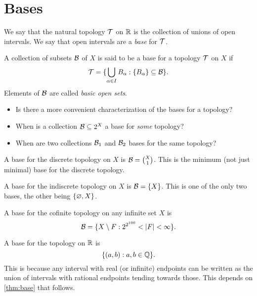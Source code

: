\section{Bases} \label{sec:bases}
We say that the natural topology $\mathcal{T}$ on $\mathbb{R}$ is the collection of unions
of open intervals.
We say that open intervals are a \emph{base} for $\mathcal{T}$.

\begin{definition*}[Base] \label{def:base}
    A collection of subsets $\mathcal{B}$ of $X$ is said to be a base for a
    topology $\mathcal{T}$ on $X$ if \[
        \mathcal{T} = \{\bigcup_{\alpha \in I} B_\alpha :
                \{B_\alpha\} \subseteq \mathcal{B}\}.
    \] Elements of $\mathcal{B}$ are called \emph{basic open sets}.
\end{definition*}

\begin{question} \leavevmode
    \begin{itemize}
        \item Is there a more convenient characterization of the bases for
            a topology?
        \item When is a collection $\mathcal{B} \subseteq 2^X$ a base for
            \emph{some} topology?
        \item When are two collections $\mathcal{B}_1$ and $\mathcal{B}_2$ bases for the
            same topology?
    \end{itemize}
\end{question}

\begin{examples}
    \item A base for the discrete topology on $X$ is $\mathcal{B} = \binom{X}{1}$.
        This is the minimum (not just minimal) base for the
        discrete topology.
    \item A base for the indiscrete topology on $X$ is $\mathcal{B} = \{X\}$.
        This is one of the only two bases, the other being $\{\varnothing, X\}$.
    \item A base for the cofinite topology on any infinite set $X$ is \[
        \mathcal{B} = \{X \setminus F : 2^{2^{100}} < \lvert F\rvert < \infty\}.
    \]
    \item A base for the topology on $\mathbb{R}$ is \[
            \{(a, b) : a, b \in \mathbb{Q}\}.
        \] This is because any interval with real (or infinite) endpoints can
        be written as the union of intervals with rational endpoints tending
        towards those.
        This depends on \cref{thm:base}
        that follows.
\end{examples}

